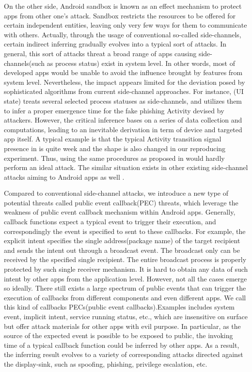 \documentclass{sig-alternate-05-2015}
\begin{document}
On the other side, Android sandbox is known as an effect mechanism to protect apps from other one's attack. Sandbox restricts the resources to be offered for certain independent entities, leaving only very few ways for them to communicate with others. Actually, through the usage of conventional so-called side-channels, certain indirect inferring gradually evolves into a typical sort of attacks. In general, this sort of attacks threat a broad range of apps causing side-channels(such as process status) exist in system level. In other words, most of developed apps would be unable to avoid the influence brought by features from system level. Nevertheless, the impact appears limited for the deviation posed by sophisticated algorithms from current side-channel approaches. For instance, \cite{chen2014peeking}(UI state) treats several selected process statuses as side-channels, and utilizes them to infer a proper emergence time for the fake phishing Activity devised by attackers. However, the critical inference bases on a series of data collection and computations, leading to an inevitable derivation in term of device and targeted app itself. A typical example is that the typical Activity transition signal presence in \cite{chen2014peeking} is quite week and the shape is also changed in our reproducing experiment. Thus, using the same procedures as proposed in \cite{chen2014peeking} would hardly perform an ideal attack. The similar situation exists in other existing side-channel attacks aiming to Android apps as well \cite{zhou2013identity}\cite{jana2012memento}.

Compared to conventional side-channel attacks, we introduce a new type of potential threats called public event callback(PEC) threats, which leverage the weakness of public event callback mechanism within Android apps. Generally, callback functions expect a typical event to trigger their execution, and correspondingly the event is specified to sent to these callbacks. For example, the explicit intent specifies the single address(package name) of the target recipient and sends the intent out through a broadcast event. The broadcast only can be received by the specified single recipient. The entire broadcast process is properly protected by such single receiver mechanism. It is hard to obtain any data of such intent by other apps from the application level. However, not all the cases emerge so ideally. There still exists a large spectrum of public events that can trigger the execution of callbacks from different components and even different apps. We call this kind of callbacks PECs(public event callbacks).Examples includes system event, implicit intent, service running status, etc., which are insensitive on surface but offer attack materials for other apps with evil purpose. In particular, as the source of the expected event is possible to be exposed to public, the invoking time of a typical callback function could be inferred by other apps. As a result, the inferring result evolves to a variety of corresponding attacks directed against the display-sink, such as spoofing, phishing, privilege escalation, etc.    
\end{document}
